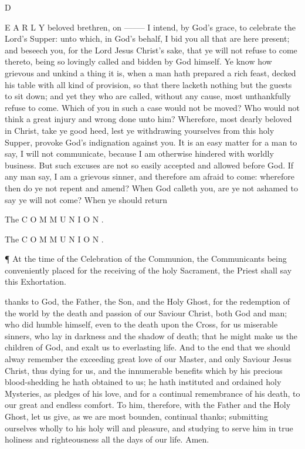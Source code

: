D

E A R L Y beloved brethren, on ––––– I intend, by God’s grace, to celebrate the Lord’s Supper: unto which, in God’s behalf, I bid you all that are here present; and beseech you, for the Lord Jesus Christ’s sake, that ye will not refuse to come thereto, being so lovingly called and bidden by God himself. Ye know how grievous and unkind a thing it is, when a man hath prepared a rich feast, decked his table with all kind of provision, so that there lacketh nothing but the guests to sit down; and yet they who are called, without any cause, most unthankfully refuse to come. Which of you in such a case would not be moved? Who would not think a great injury and wrong done unto him? Wherefore, most dearly beloved in Christ, take ye good heed, lest ye withdrawing yourselves from this holy Supper, provoke God’s indignation against you. It is an easy matter for a man to say, I will not communicate, because I am otherwise hindered with worldly business. But such excuses are not so easily accepted and allowed before God. If any man say, I am a grievous sinner, and therefore am afraid to come: wherefore then do ye not repent and amend? When God calleth you, are ye not ashamed to say ye will not come? When ye should return

The C O M M U N I O N .

The C O M M U N I O N .

¶ At the time of the Celebration of the Communion, the Communicants being conveniently placed for the receiving of the holy Sacrament, the Priest shall say this Exhortation.

thanks to God, the Father, the Son, and the Holy Ghost, for the redemption of the world by the death and passion of our Saviour Christ, both God and man; who did humble himself, even to the death upon the Cross, for us miserable sinners, who lay in darkness and the shadow of death; that he might make us the children of God, and exalt us to everlasting life. And to the end that we should alway remember the exceeding great love of our Master, and only Saviour Jesus Christ, thus dying for us, and the innumerable benefits which by his precious blood-shedding he hath obtained to us; he hath instituted and ordained holy Mysteries, as pledges of his love, and for a continual remembrance of his death, to our great and endless comfort. To him, therefore, with the Father and the Holy Ghost, let us give, as we are most bounden, continual thanks; submitting ourselves wholly to his holy will and pleasure, and studying to serve him in true holiness and righteousness all the days of our life. Amen.

